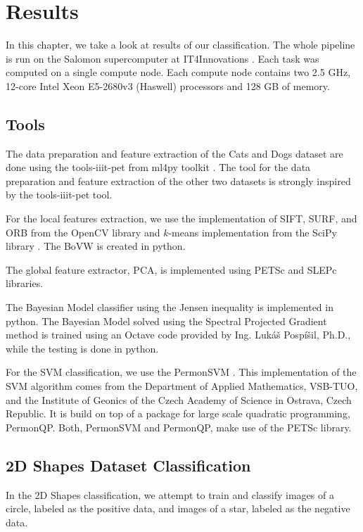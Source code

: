 \chapter{Results}
In this chapter, we take a look at results of our classification. The whole pipeline is run on the Salomon supercomputer at IT4Innovations \cite{Salomon-WWW-17}. Each task was computed on a single compute node. Each compute node contains two 2.5 GHz, 12-core Intel Xeon E5-2680v3 (Haswell) processors and 128 GB of memory.

\section{Tools}
The data preparation and feature extraction of the Cats and Dogs dataset are done using the tools-iiit-pet from ml4py toolkit \cite{tools_iiit}. The tool for the data preparation and feature extraction of the other two datasets is strongly inspired by the tools-iiit-pet tool.

For the local features extraction, we use the implementation of SIFT, SURF, and ORB from the OpenCV library \cite{opencv} and $k$-means implementation from the SciPy library \cite{scipy}. The BoVW is created in python.

The global feature extractor, PCA, is implemented using PETSc \cite{petsc} and SLEPc \cite{slepc} libraries.

The Bayesian Model classifier using the Jensen inequality is implemented in python. The Bayesian Model solved using the Spectral Projected Gradient method is trained using an Octave code provided by Ing. Lukáš Pospíšil, Ph.D., while the testing is done in python.

For the SVM classification, we use the PermonSVM \cite{permonSVM}. This implementation of the SVM algorithm comes from the Department of Applied Mathematics, VSB-TUO, and the Institute of Geonics of the Czech Academy of Science in Ostrava, Czech Republic. It is build on top of a package for large scale quadratic programming, PermonQP. Both, PermonSVM and PermonQP, make use of the PETSc \cite{petsc} library.

\section{2D Shapes Dataset Classification}
In the 2D Shapes classification, we attempt to train and classify images of a circle, labeled as the positive data, and images of a star, labeled as the negative data.

